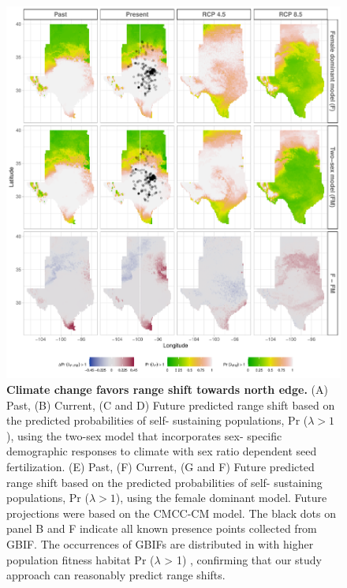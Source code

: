 \documentclass[12pt]{article}\usepackage[]{graphicx}\usepackage[dvipsnames]{xcolor}
\begin{document}
\begin{figure}[H]
	\begin{center}
		\includegraphics[width=0.99\linewidth]{Figures/Fig_geoPrlambdacmc.pdf}
		\caption{ \textbf{Climate change favors range shift towards north edge.}
			(A) Past, (B) Current, (C and D) Future predicted range shift based on the predicted probabilities of self- sustaining populations, Pr ($\lambda > 1$), using the two-sex model that incorporates sex- specific demographic responses to climate with sex ratio dependent seed fertilization.
			(E) Past, (F) Current, (G and F) Future  predicted range shift based on the predicted probabilities of self- sustaining populations, Pr ($\lambda > 1$), using the female dominant model.
			Future projections were based on the CMCC-CM model.
			The black dots on panel B and F indicate all known presence points collected from GBIF. 
			The occurrences of GBIFs are distributed in with higher population fitness habitat Pr ($\lambda$ > 1) , confirming that our study approach can reasonably predict range shifts. }
		\label{fig:geoprojcmc}
	\end{center}
\end{figure}
\end{document}
